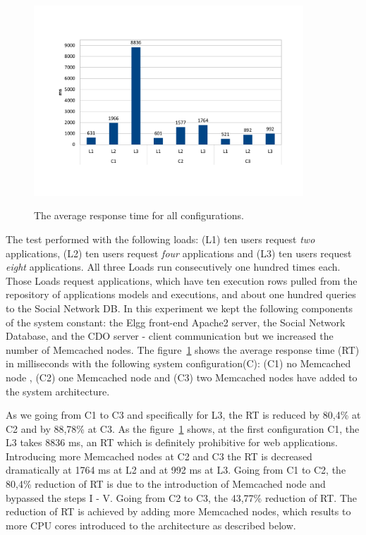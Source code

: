 \begin{figure}[h]
	\caption{The average response time for all configurations.}
	\includegraphics[width=0.9\textwidth,natwidth=200,natheight=150]{./fig/RTavg.pdf}
	\centering
	\label{fig:rtavg}
\end{figure}

The test performed with the following loads: (L1) ten users request \emph{two} applications, (L2) ten users request \emph{four} applications and (L3) ten users request \emph{eight} applications. All three Loads run consecutively one hundred times each. Those Loads request applications, which have ten execution rows pulled from the repository of applications models and executions, and about one hundred queries to the Social Network DB. In this experiment we kept the following components of the system constant: the Elgg front-end Apache2 server, the Social Network Database, and the CDO server - client communication but we increased the number of Memcached nodes.
The figure~\ref{fig:rtavg} shows the  average response time (RT) in milliseconds with the following system configuration(C): (C1) no Memcached node , (C2) one Memcached node and (C3) two Memcached nodes have added to the system architecture.

As we going from C1 to C3 and specifically for L3, the RT is reduced by 80,4\% at C2 and by 88,78\% at C3. As the figure~\ref{fig:rtavg} shows, at the first configuration C1, the L3 takes 8836 ms, an RT which is definitely prohibitive for web applications. Introducing more Memcached nodes at C2 and C3 the RT is decreased dramatically at 1764 ms at L2 and at 992 ms at L3. Going from C1 to C2, the 80,4\% reduction of RT is due to the introduction of Memcached node and bypassed the steps I - V. Going from C2 to C3, the 43,77\% reduction of RT. The reduction of RT is achieved by adding more Memcached nodes, which results to more CPU cores introduced to the architecture as described below.


